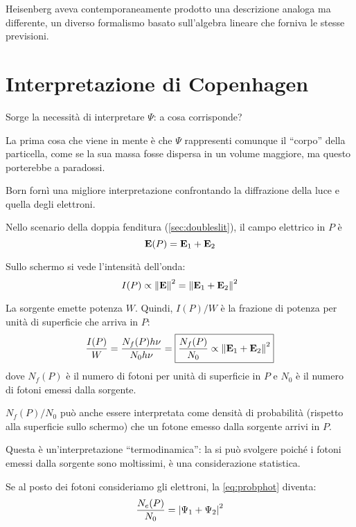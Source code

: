 Heisenberg aveva contemporaneamente prodotto una descrizione analoga ma differente, un diverso formalismo basato sull'algebra lineare che forniva le stesse previsioni.

\section{Interpretazione di Copenhagen}

Sorge la necessità di interpretare $\Psi$: a cosa corrisponde?

La prima cosa che viene in mente è che $\Psi$ rappresenti comunque il ``corpo'' della particella, come se la sua massa fosse dispersa in un volume maggiore, ma questo porterebbe a paradossi.

Born fornì una migliore interpretazione confrontando la diffrazione della luce e quella degli elettroni.

Nello scenario della doppia fenditura (\autoref{sec:doubleslit}), il campo elettrico in $P$ è
\begin{equation}
    \mathbf{E}(P) = \mathbf{E}_1 + \mathbf{E}_2
\end{equation}

Sullo schermo si vede l'intensità dell'onda:
\begin{equation}
    I(P) \propto \left\lVert \mathbf{E} \right\rVert^2 = \left\lVert \mathbf{E}_1 + \mathbf{E}_2 \right\rVert^2
\end{equation}

La sorgente emette potenza $W$.
Quindi, $I(P)/W$ è la frazione di potenza per unità di superficie che arriva in $P$:
\begin{equation}
\label{eq:probphot}
    \frac{I(P)}{W}
    = \frac{N_f(P) h \nu}{N_0 h \nu}
    = \boxed{\frac{N_f(P)}{N_0}
    \propto \left\lVert \mathbf{E}_1 + \mathbf{E}_2 \right\rVert^2}
\end{equation}
dove $N_f(P)$ è il numero di fotoni per unità di superficie in $P$ e $N_0$ è il numero di fotoni emessi dalla sorgente.

$N_f(P)/N_0$ può anche essere interpretata come densità di probabilità (rispetto alla superficie sullo schermo) che un fotone emesso dalla sorgente arrivi in $P$.

Questa è un'interpretazione ``termodinamica'': la si può svolgere poiché i fotoni emessi dalla sorgente sono moltissimi, è una considerazione statistica.

Se al posto dei fotoni consideriamo gli elettroni, la \eqref{eq:probphot} diventa:
\begin{equation}
    \frac{N_e(P)}{N_0} = \left\lvert \Psi_1 + \Psi_2 \right\rvert^2
\end{equation}


